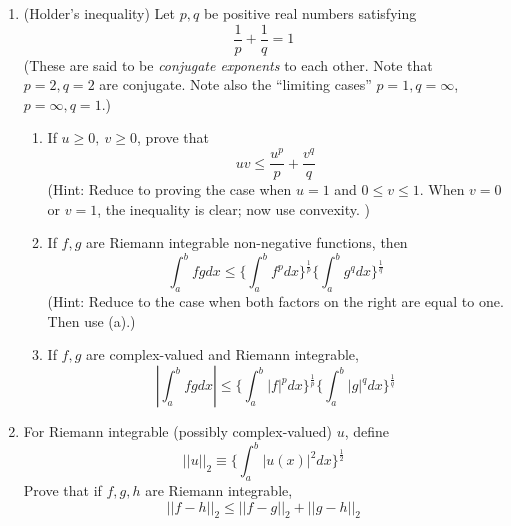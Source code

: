 \documentclass[11pt]{amsart}
\theoremstyle{definition}
\begin{document}
\begin{enumerate}[wide, labelwidth=!, labelindent=0pt]
\item (Holder's inequality) Let $p,q$ be positive real numbers satisfying
\[
\frac{1}{p} + \frac{1}{q} =1 
\]
(These  are said to be \emph{conjugate exponents} to each other. Note that $p=2,q=2$ are conjugate. Note also the ``limiting cases'' $p=1,q=\infty$, $p=\infty, q=1$.)
\begin{enumerate}[label=(\alph*)]
\item If $u \ge 0, \ v \ge 0$, prove that
\[
uv \le \frac{u^p}{p}+\frac{v^q}{q}
\]
(Hint: Reduce to proving the case when $u=1$ and $0 \le v \le 1$. When $v=0$ or $v=1$, the inequality is clear; now use convexity. )
\item  If $f,g$ are Riemann integrable non-negative functions, then
\[
\int_a^b fg dx  \le \{\int_a^b f^p dx\}^{\frac{1}{p}} \{\int_a^b g^q dx\}^{\frac{1}{q}}
\]
(Hint: Reduce to the case when both factors on the right are equal to one. Then use (a).)
\item If $f,g$ are complex-valued and Riemann integrable,
\[
|\int_a^b fg dx|  \le \{\int_a^b |f|^p dx\}^{\frac{1}{p}} \{\int_a^b |g|^q dx\}^{\frac{1}{q}}
\]

\end{enumerate} 

\item For Riemann integrable (possibly complex-valued) $u$, define
\[
||u||_2 \equiv \{\int_a^b |u(x)|^2 dx\}^\frac{1}{2}
\]
Prove that if $f,g,h$ are Riemann integrable,
\[
||f-h||_2 \le ||f-g||_2+||g-h||_2
\]



\end{enumerate}
\end{document}
